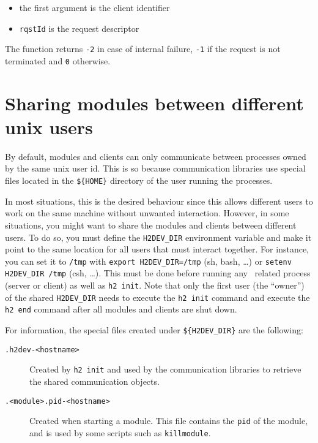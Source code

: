 \begin{itemize}
\item the first argument is the client identifier
\item \texttt{rqstId} is the request descriptor
\end{itemize}

The function returns \texttt{-2} in case of internal failure, \texttt{-1} if
the request is not terminated and \texttt{0} otherwise.


\section{Sharing modules between different unix users}
\label{sec|h2devdir}

By default, modules and clients can only communicate between processes owned by
the same unix user id. This is so because communication libraries use special
files located in the \texttt{\$\{HOME\}} directory of the user running the
processes.

In most situations, this is the desired behaviour since this allows different
users to work on the same machine without unwanted interaction. However, in
some situations, you might want to share the modules and clients between
different users. To do so, you must define the \texttt{H2DEV\_DIR} environment
variable and make it point to the same location for all users that must
interact together. For instance, you can set it to \texttt{/tmp} with
\texttt{export H2DEV\_DIR=/tmp} (sh, bash, \ldots) or \texttt{setenv H2DEV\_DIR
/tmp} (csh, \ldots). This must be done before running any \GenoM\ related process
(server or client) as well as \texttt{h2 init}. Note that only the first user
(the ``owner'') of the shared \texttt{H2DEV\_DIR} needs to execute the \texttt{h2
init} command and execute the \texttt{h2 end} command after all modules and
clients are shut down.

For information, the special files created under \texttt{\$\{H2DEV\_DIR\}} are
the following:
\begin{description}
   \item[\texttt{.h2dev-<hostname>}] Created by \texttt{h2 init} and used by
   the communication libraries to retrieve the shared communication objects.

   \item[\texttt{.<module>.pid-<hostname>}] Created when starting a \GenoM{}
   module. This file contains the \texttt{pid} of the module, and is used by
   some scripts such as \texttt{killmodule}.
\end{description}
